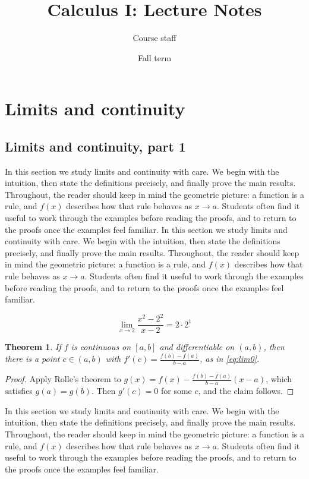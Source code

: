 \documentclass[11pt]{article}
\title{Calculus I: Lecture Notes}
\author{Course staff}
\date{Fall term}
\newtheorem{theorem}{Theorem}[section]
\begin{document}
\maketitle
\tableofcontents

\section{Limits and continuity}

\subsection{Limits and continuity, part 1}

In this section we study limits and continuity with care. We begin with the intuition, then state the definitions precisely, and finally prove the main results. Throughout, the reader should keep in mind the geometric picture: a function is a rule, and $f(x)$ describes how that rule behaves as $x \to a$. Students often find it useful to work through the examples before reading the proofs, and to return to the proofs once the examples feel familiar. In this section we study limits and continuity with care. We begin with the intuition, then state the definitions precisely, and finally prove the main results. Throughout, the reader should keep in mind the geometric picture: a function is a rule, and $f(x)$ describes how that rule behaves as $x \to a$. Students often find it useful to work through the examples before reading the proofs, and to return to the proofs once the examples feel familiar. 

\begin{equation}
  \lim_{x \to 2} \frac{x^{2} - 2^{2}}{x - 2} = 2 \cdot 2^{1}
  \label{eq:lim0}
\end{equation}

\begin{theorem}
If $f$ is continuous on $[a,b]$ and differentiable on $(a,b)$, then there is a point $c \in (a,b)$ with $f'(c) = \frac{f(b)-f(a)}{b-a}$, as in \eqref{eq:lim0}.
\end{theorem}

\begin{proof}
Apply Rolle's theorem to $g(x) = f(x) - \frac{f(b)-f(a)}{b-a}(x-a)$, which satisfies $g(a) = g(b)$. Then $g'(c) = 0$ for some $c$, and the claim follows.
\end{proof}

In this section we study limits and continuity with care. We begin with the intuition, then state the definitions precisely, and finally prove the main results. Throughout, the reader should keep in mind the geometric picture: a function is a rule, and $f(x)$ describes how that rule behaves as $x \to a$. Students often find it useful to work through the examples before reading the proofs, and to return to the proofs once the examples feel familiar. 
\end{document}

